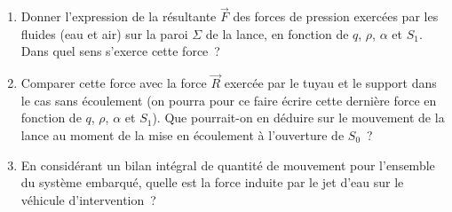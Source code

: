 {\begin{enumerate}
et calculer leur valeur dans le r\'egime de fonctionnement d\'ecrit dans
la question pr\'ec\'edente.
\item
Donner l'expression de la r\'esultante $\vec{F}$
des forces de pression exerc\'ees par les fluides (eau et air)
sur la paroi $\Sigma$ de la lance, en fonction de $q$, $\rho$, $\alpha$
et $S_1$.
Dans quel sens s'exerce cette force~?
\item
Comparer cette force avec la force $\vec{R}$ exerc\'ee par le tuyau
et le support dans le cas sans \'ecoulement (on pourra pour ce faire
\'ecrire cette derni\`ere force en fonction de $q$, $\rho$, $\alpha$
et $S_1$).
Que pourrait-on en d\'eduire sur le mouvement de la lance au moment
de la mise en \'ecoulement \`a l'ouverture de $S_0$~?
\item
En consid\'erant un bilan int\'egral de quantit\'e de mouvement pour l'ensemble
du syst\`eme embarqu\'e, quelle est la force induite par le jet d'eau sur
le v\'ehicule d'intervention~? 
\end{enumerate}
}


